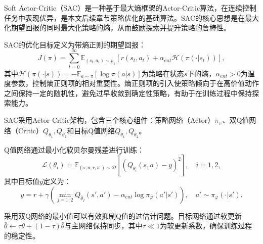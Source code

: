 Soft Actor-Critic（SAC）\cite{Haarnoja2018SAC}是一种基于最大熵框架的Actor-Critic算法，在连续控制任务中表现优异，是本文后续章节策略优化的基础算法。SAC的核心思想是在最大化期望回报的同时最大化策略的熵，从而鼓励探索并提升策略的鲁棒性。

SAC的优化目标定义为带熵正则的期望回报：
\begin{equation}\label{Eq:Chap2_sac_objective}
  J(\pi) = \sum_{t=0}^{\infty} \mathbb{E}_{(s_t, a_t) \sim \rho_\pi}\left[r(s_t, a_t) + \alpha_{ent} \mathcal{H}(\pi(\cdot|s_t))\right],
\end{equation}
其中$\mathcal{H}(\pi(\cdot|s)) = -\mathbb{E}_{a \sim \pi}[\log \pi(a|s)]$为策略在状态$s$下的熵，$\alpha_{ent} > 0$为温度参数，控制熵正则项的相对重要性。熵正则项的引入使策略倾向于在高价值动作之间保持一定的随机性，避免过早收敛到确定性策略，有助于在训练过程中保持探索能力。

SAC采用Actor-Critic架构，包含三个核心组件：策略网络（Actor）$\pi_\varphi$、双Q值网络（Critic）$Q_{\theta_1}, Q_{\theta_2}$和目标Q值网络$Q_{\bar{\theta}_1}, Q_{\bar{\theta}_2}$。

Q值网络通过最小化软贝尔曼残差进行训练：
\begin{equation}\label{Eq:Chap2_sac_critic}
  \mathcal{L}(\theta_i) = \mathbb{E}_{(s, a, r, s') \sim \mathcal{D}}\left[\left(Q_{\theta_i}(s, a) - y\right)^2\right], \quad i = 1, 2,
\end{equation}
其中目标值$y$定义为：
\begin{equation}\label{Eq:Chap2_sac_target}
  y = r + \gamma \left(\min_{j=1,2} Q_{\bar{\theta}_j}(s', a') - \alpha_{ent} \log \pi_\varphi(a'|s')\right), \quad a' \sim \pi_\varphi(\cdot|s').
\end{equation}

采用双Q网络的最小值可以有效抑制Q值的过估计问题\cite{Hasselt2016DoubleDQN}。目标网络通过软更新$\bar{\theta} \leftarrow \tau \theta + (1 - \tau) \bar{\theta}$与主网络保持同步，其中$\tau \ll 1$为软更新系数，确保训练过程的稳定性。

